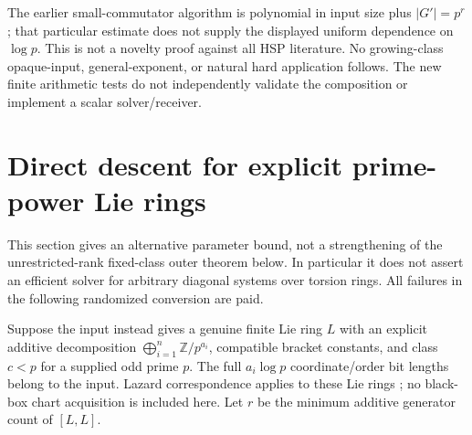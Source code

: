 \documentclass[11pt]{article}
\theoremstyle{remark}
\begin{document}
The earlier small-commutator algorithm \cite[Theorem 11]{ims} is polynomial
in input size plus $|G'|=p^r$; that particular estimate does not supply
the displayed uniform dependence on $\log p$. This is not a novelty proof
against all HSP literature. No growing-class opaque-input, general-exponent,
or natural hard application follows. The new finite arithmetic tests do not
independently validate the composition or implement a scalar solver/receiver.

\section{Direct descent for explicit prime-power Lie rings}\label{sec:ring}
This section gives an alternative parameter bound, not a strengthening of
the unrestricted-rank fixed-class outer theorem below. In particular it
does not assert an efficient solver for arbitrary diagonal systems over
torsion rings. All failures in the following randomized conversion are paid.

Suppose the input instead gives a genuine finite Lie ring $L$ with an
explicit additive decomposition $\bigoplus_{i=1}^n\mathbb Z/p^{a_i}$,
compatible bracket constants, and class $c<p$ for a supplied odd prime $p$.
The full $a_i\log p$ coordinate/order bit lengths belong to the input.
Lazard correspondence applies to these Lie rings
\cite{lazardring,lazardtorsion}; no
black-box chart acquisition is included here. Let $r$ be the minimum
additive generator count of $[L,L]$.
\end{document}
